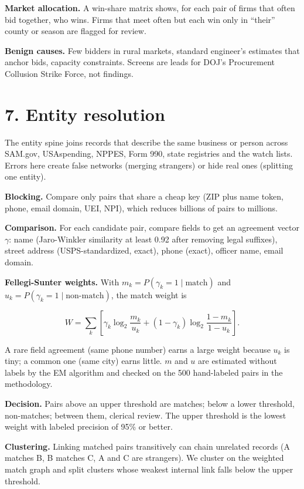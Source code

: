 \documentclass[letterpaper,11pt]{article}
\begin{document}
\textbf{Market allocation.} A win-share matrix shows, for each pair of
firms that often bid together, who wins. Firms that meet often but each
win only in ``their'' county or season are flagged for review.

\textbf{Benign causes.} Few bidders in rural markets, standard
engineer's estimates that anchor bids, capacity constraints. Screens are
leads for DOJ's Procurement Collusion Strike Force, not findings.

\hypertarget{entity-resolution}{%
\section*{7. Entity resolution}\label{entity-resolution}}

The entity spine joins records that describe the same business or person
across SAM.gov, USAspending, NPPES, Form 990, state registries and the
watch lists. Errors here create false networks (merging strangers) or
hide real ones (splitting one entity).

\textbf{Blocking.} Compare only pairs that share a cheap key (ZIP plus
name token, phone, email domain, UEI, NPI), which reduces billions of
pairs to millions.

\textbf{Comparison.} For each candidate pair, compare fields to get an
agreement vector \(\gamma\): name (Jaro-Winkler similarity at least 0.92
after removing legal suffixes), street address (USPS-standardized,
exact), phone (exact), officer name, email domain.

\textbf{Fellegi-Sunter weights.} With
\(m_k = P(\gamma_k = 1 \mid \text{match})\) and
\(u_k = P(\gamma_k = 1 \mid \text{non-match})\), the match weight is

\[W = \sum_k \left[\gamma_k \log_2 \frac{m_k}{u_k} + (1 - \gamma_k)\log_2\frac{1 - m_k}{1 - u_k}\right].\]

A rare field agreement (same phone number) earns a large weight because
\(u_k\) is tiny; a common one (same city) earns little. \(m\) and \(u\)
are estimated without labels by the EM algorithm and checked on the 500
hand-labeled pairs in the methodology.

\textbf{Decision.} Pairs above an upper threshold are matches; below a
lower threshold, non-matches; between them, clerical review. The upper
threshold is the lowest weight with labeled precision of 95\% or better.

\textbf{Clustering.} Linking matched pairs transitively can chain
unrelated records (A matches B, B matches C, A and C are strangers). We
cluster on the weighted match graph and split clusters whose weakest
internal link falls below the upper threshold.
\end{document}
